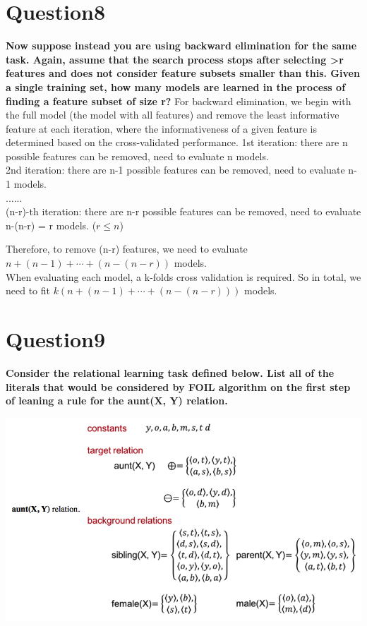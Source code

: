 \documentclass[paper=a4, fontsize=11pt]{scrartcl} %
\numberwithin{equation}{section} %
\numberwithin{figure}{section} %
\numberwithin{table}{section} %
\begin{document}
\newpage
\section*{Question8}
\textbf{Now suppose instead you are using backward elimination for the same task. Again, assume that the search process stops after selecting >r features and does not consider feature subsets smaller than this. Given a single training set, how many models are learned in the process of finding a feature subset of size r?}
\bigbreak
For backward elimination, we begin with the full model (the model with all features) and remove the least informative feature at each iteration, where the informativeness of a given feature is determined based on the cross-validated performance. 
\bigbreak
1st iteration: there are n possible features can be removed, need to evaluate n models. \\
2nd iteration: there are n-1 possible features can be removed, need to evaluate n-1 models. \\
......\\
(n-r)-th iteration: there are n-r possible features can be removed, need to evaluate n-(n-r) = r models. ($r \leq n$)
\bigbreak

Therefore, to remove (n-r) features, we need to evaluate $n + (n-1) + \cdots + (n-(n-r))$ models. \\

When evaluating each model, a k-folds cross validation is required. So in total, we need to fit $k(n + (n-1) + \cdots + (n-(n-r)))$ models. 



\newpage
\section*{Question9}
\textbf{Consider the relational learning task defined below. List all of the literals that would be considered by FOIL algorithm on the first step of leaning a rule for the aunt(X, Y) relation. }
\begin{center}
	\includegraphics[scale=.45]{pics/hw5_9.png}
\end{center}
\end{document}
